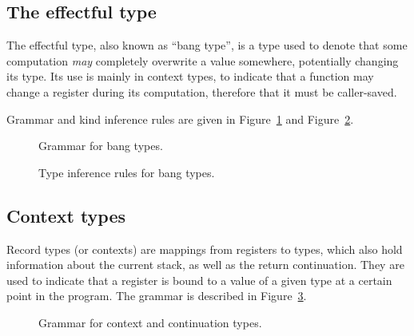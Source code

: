 \subsection{The effectful type}\label{subsec:nstar-common-ts-effect}

The effectful type, also known as ``bang type'', is a type used to denote that some computation \textit{may} completely overwrite a value somewhere, potentially changing its type.
Its use is mainly in context types, to indicate that a function may change a register during its computation, therefore that it must be caller-saved.

Grammar and kind inference rules are given in Figure~\ref{fig:nstar-common-ts-effect-syntax} and Figure~\ref{fig:nstar-common-ts-effect-kindrules}.

\begin{figure}[htb]
	\centering


	\caption{Grammar for bang types.}
	\label{fig:nstar-common-ts-effect-syntax}
\end{figure}

\begin{figure}[htb]
	\centering


	\caption{Type inference rules for bang types.}
	\label{fig:nstar-common-ts-effect-kindrules}
\end{figure}

\subsection{Context types}\label{subsec:nstar-common-ts-records}

Record types (or contexts) are mappings from registers to types, which also hold information about the current stack, as well as the return continuation.
They are used to indicate that a register is bound to a value of a given type at a certain point in the program.
The grammar is described in Figure~\ref{fig:nstar-common-ts-records-syntax}.

\begin{figure}[htb]
	\centering
	\caption{Grammar for context and continuation types.}
	\label{fig:nstar-common-ts-records-syntax}
\end{figure}

